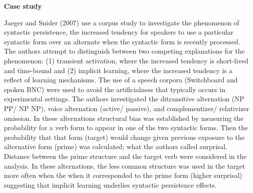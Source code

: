 \documentclass[
  letterpaper,
]{latex/krantz}
\begin{document}
\begin{tcolorbox}[enhanced jigsaw, colbacktitle=quarto-callout-caution-color!10!white, arc=.35mm, toprule=.15mm, breakable, colframe=quarto-callout-caution-color-frame, bottomrule=.15mm, opacitybacktitle=0.6, coltitle=black, titlerule=0mm, colback=white, toptitle=1mm, bottomtitle=1mm, title=\textcolor{quarto-callout-caution-color}{\faFire}\hspace{0.5em}{Caution}, rightrule=.15mm, leftrule=.75mm, opacityback=0, left=2mm]

\textbf{Case study}

Jaeger and Snider (2007) use a corpus study to investigate the
phenomenon of syntactic persistence, the increased tendency for speakers
to use a particular syntactic form over an alternate when the syntactic
form is recently processed. The authors attempt to distinguish between
two competing explanations for the phenomenon: (1) transient activation,
where the increased tendency is short-lived and time-bound and (2)
implicit learning, where the increased tendency is a reflect of learning
mechanisms. The use of a speech corpora (Switchboard and spoken BNC)
were used to avoid the artificialness that typically occurs in
experimental settings. The authors investigated the ditransitive
alternation (NP PP/ NP NP), voice alternation (active/ passive), and
complementizer/ relativizer omission. In these alternations structural
bias was established by measuring the probability for a verb form to
appear in one of the two syntactic forms. Then the probability that that
form (target) would change given previous exposure to the alternative
form (prime) was calculated; what the authors called surprisal. Distance
between the prime structure and the target verb were considered in the
analysis. In these alternations, the less common structure was used in
the target more often when the when it corresponded to the prime form
(higher surprisal) suggesting that implicit learning underlies syntactic
persistence effects.

\end{tcolorbox}
\end{document}
